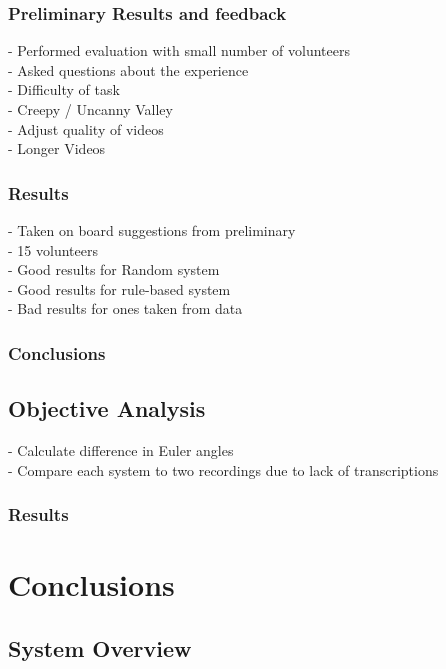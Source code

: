 \documentclass[bsc,frontabs,twoside,singlespacing,parskip]{infthesis}
\begin{document}
\subsection{Preliminary Results and feedback}

- Performed evaluation with small number of volunteers \\

- Asked questions about the experience \\
- Difficulty of task \\
- Creepy / Uncanny Valley \\
- Adjust quality of videos \\
- Longer Videos \\ 

\subsection{Results}

- Taken on  board suggestions from preliminary \\
- 15 volunteers \\
- Good results for Random system \\
- Good results for rule-based system \\
- Bad results for ones taken from data \\

\subsection{Conclusions}


\section{Objective Analysis}

- Calculate difference in Euler angles\\
- Compare each system to two recordings due to lack of transcriptions\\

\subsection{Results}
\chapter{Conclusions}

\section{System Overview}
\end{document}
